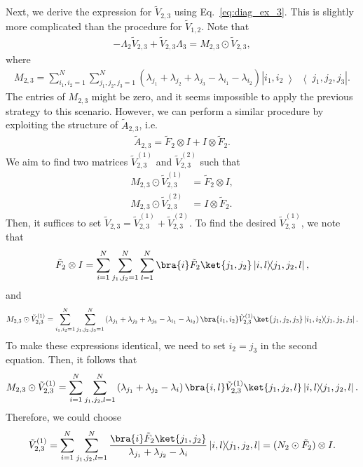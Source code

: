\documentclass[superscriptaddress,onecolumn,nofootinbib,longbibliography,a4paper,accepted=2026-09-29]{quantumarticle}
\theoremstyle{plain}
\theoremstyle{definition}
\numberwithin{thm}{section}
\numberwithin{assumption}{section}
\numberwithin{lemma}{section}
\numberwithin{prop}{section}
\numberwithin{cor}{section}
\numberwithin{definition}{section}
\numberwithin{rmk}{section}
\numberwithin{equation}{section}
\newcommand{\ketbra}[2]   {\left|#1\middle\rangle\!\middle\langle#2\right|}
\newcommand{\lrb}[1]{\left ( #1 \right )}
\begin{document}
Next, we derive the expression for $\tilde{V}_{2,3}$ using Eq.~\eqref{eq:diag_ex_3}. This is slightly more complicated than the procedure for $\tilde{V}_{1,2}$. Note that
\begin{align}
    -\Lambda_2 \tilde{V}_{2,3} + \tilde{V}_{2,3} \Lambda_3 = M_{2,3} \odot \tilde{V}_{2,3},    
\end{align}
where 
\begin{align}
M_{2,3}=\sum_{i_1,i_2=1}^N \sum_{j_1,j_2,j_3=1}^N \lrb{\lambda_{j_1}+\lambda_{j_2}+\lambda_{j_3}-\lambda_{i_1}-\lambda_{i_2}} \ketbra{i_1,i_2}{j_1,j_2,j_3}.    
\end{align}
The entries of $M_{2,3}$ might be zero, and it seems impossible to apply the previous strategy to this scenario. However, we can perform a similar procedure by exploiting the structure of $\tilde{A}_{2,3}$, i.e.
\begin{align}
\tilde{A}_{2,3}=\tilde{F}_2 \otimes I + I \otimes \tilde{F}_2.    
\end{align}
We aim to find two matrices $\tilde{V}_{2,3}^{(1)}$ and $\tilde{V}_{2,3}^{(2)}$ such that
\begin{align}
M_{2,3}\odot \tilde{V}_{2,3}^{(1)} &= \tilde{F}_2 \otimes I, \\   
M_{2,3}\odot \tilde{V}_{2,3}^{(2)} &= I \otimes \tilde{F}_2. 
\end{align}
Then, it suffices to set $\tilde{V}_{2,3}=\tilde{V}_{2,3}^{(1)}+\tilde{V}_{2,3}^{(2)}$. To find the desired $\tilde{V}_{2,3}^{(1)}$, we note that
\begin{align}
\tilde{F}_2 \otimes I=\sum_{i=1}^N \sum_{j_1,j_2=1}^N \sum_{l=1}^N \bra{i}\tilde{F}_2\ket{j_1,j_2} \ketbra{i,l}{j_1,j_2,l},    
\end{align}
and
\begin{align}
M_{2,3}\odot \tilde{V}_{2,3}^{(1)} = \sum_{i_1,i_2=1}^N \sum_{j_1,j_2,j_3=1}^N \lrb{\lambda_{j_1}+\lambda_{j_2}+\lambda_{j_3}-\lambda_{i_1}-\lambda_{i_2}}
\bra{i_1,i_2}\tilde{V}_{2,3}^{(1)}\ket{j_1,j_2,j_3} \ketbra{i_1,i_2}{j_1,j_2,j_3}.
\end{align}
To make these expressions identical, we need to set $i_2=j_3$ in the second equation. Then, it follows that 
\begin{align}
M_{2,3}\odot \tilde{V}_{2,3}^{(1)} = \sum_{i=1}^N \sum_{j_1,j_2,l=1}^N \lrb{\lambda_{j_1}+\lambda_{j_2}-\lambda_{i}}
\bra{i,l}\tilde{V}_{2,3}^{(1)}\ket{j_1,j_2,l} \ketbra{i,l}{j_1,j_2,l}.
\end{align}
Therefore, we could choose
\begin{align}
\tilde{V}_{2,3}^{(1)} = \sum_{i=1}^N \sum_{j_1,j_2,l=1}^N
\frac{\bra{i}\tilde{F}_2\ket{j_1,j_2}}{\lambda_{j_1}+\lambda_{j_2}-\lambda_i} \ketbra{i,l}{j_1,j_2,l}
= (N_2 \odot \tilde{F}_2) \otimes I.
\end{align}
\end{document}
